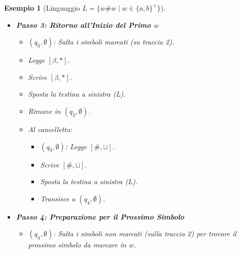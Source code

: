 \documentclass[a4paper]{article}
\newtheorem{example}{Esempio}
\begin{document}
\begin{example}[Linguaggio $L = \{w\#w \mid w \in \{a,b\}^+\}$]
\begin{itemize}
\begin{itemize}
            \item Scrive $[\beta, *]$.
            \item Sposta la testina a destra (R).
            \item Rimane in $(q_2, \alpha)$.
            \item Quando trova il simbolo corrispondente a $\alpha$:
                \begin{itemize}
                    \item $(q_2, \alpha)$: Legge $[\alpha, \sqcup]$.
                    \item Scrive $[\alpha, *]$.
                    \item Sposta la testina a sinistra (L).
                    \item Transisce a $(q_3, \emptyset)$ (non serve più memorizzare $\alpha$).
                \end{itemize}
        \end{itemize}
    \item \textbf{Passo 3: Ritorno all'Inizio del Primo $w$}
        \begin{itemize}
            \item $(q_3, \emptyset)$: Salta i simboli marcati (su traccia 2).
            \item Legge $[\beta, *]$.
            \item Scrive $[\beta, *]$.
            \item Sposta la testina a sinistra (L).
            \item Rimane in $(q_3, \emptyset)$.
            \item Al cancelletto:
                \begin{itemize}
                    \item $(q_3, \emptyset)$: Legge $[\#, \sqcup]$.
                    \item Scrive $[\#, \sqcup]$.
                    \item Sposta la testina a sinistra (L).
                    \item Transisce a $(q_4, \emptyset)$.
                \end{itemize}
        \end{itemize}
    \item \textbf{Passo 4: Preparazione per il Prossimo Simbolo}
        \begin{itemize}
            \item $(q_4, \emptyset)$: Salta i simboli non marcati (sulla traccia 2) per trovare il prossimo simbolo da marcare in $w$.

\end{itemize}
\end{itemize}
\end{example}
\end{document}
